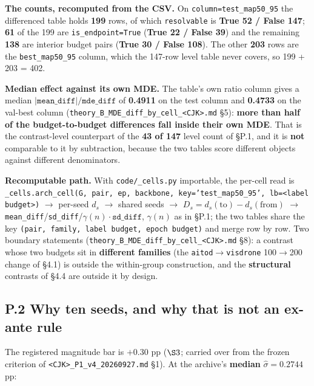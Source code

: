 \documentclass[pdflatex,sn-mathphys-ay]{sn-jnl}
\begin{document}
\textbf{The counts, recomputed from the CSV.} On \texttt{column=test\_map50\_95} the differenced table holds \textbf{199} rows, of which \texttt{resolvable} is \textbf{True 52 / False 147}; \textbf{61} of the 199 are \texttt{is\_endpoint=True} (\textbf{True 22 / False 39}) and the remaining \textbf{138} are interior budget pairs (\textbf{True 30 / False 108}). The other \textbf{203} rows are the \texttt{best\_map50\_95} column, which the 147-row level table never covers, so 199 + 203 = 402.

\textbf{Median effect against its own MDE.} The table's own ratio column gives a median $|\texttt{mean\_diff}|/\texttt{mde\_diff}$ of \textbf{0.4911} on the test column and \textbf{0.4733} on the val-best column (\texttt{theory\_B\_MDE\_diff\_by\_cell\_<CJK>.md} \S{}5): \textbf{more than half of the budget-to-budget differences fall inside their own MDE}. That is the contrast-level counterpart of the \textbf{43 of 147} level count of \S{}P.1, and it is \textbf{not} comparable to it by subtraction, because the two tables score different objects against different denominators.

\textbf{Recomputable path.} With \texttt{code/\_cells.py} importable, the per-cell read is \texttt{\_cells.arch\_cell(G, pair, ep, backbone, key='test\_map50\_95', lb=\textless{}label budget\textgreater{})} \ensuremath{\rightarrow} per-seed $d_s$ \ensuremath{\rightarrow} shared seeds \ensuremath{\rightarrow} $D_s=d_s(\text{to})-d_s(\text{from})$ \ensuremath{\rightarrow} \texttt{mean\_diff}/\texttt{sd\_diff}/$\gamma(n)\cdot\texttt{sd\_diff}$, $\gamma(n)$ as in \S{}P.1; the two tables share the key \texttt{(pair, family, label budget, epoch budget)} and merge row by row. Two boundary statements (\texttt{theory\_B\_MDE\_diff\_by\_cell\_<CJK>.md} \S{}8): a contrast whose two budgets sit in \textbf{different families} (the \texttt{aitod\ensuremath{\rightarrow}visdrone} 100\ensuremath{\rightarrow}200 change of \S{}4.1) is outside the within-group construction, and the \textbf{structural} contrasts of \S{}4.4 are outside it by design.

\subsection*{P.2 Why ten seeds, and why that is not an ex-ante rule}

The registered magnitude bar is $+0.30$ pp ($\S3$; carried over from the frozen criterion of \texttt{<CJK>\_P1\_v4\_20260927.md} \S{}1). At the archive's \textbf{median} $\hat\sigma=0.2744$ pp:
\end{document}
